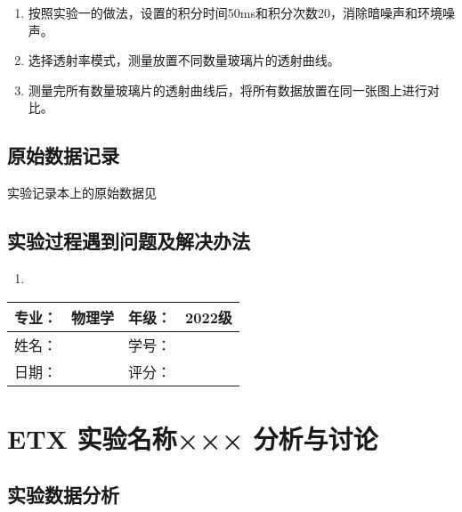 \documentclass[dvipsnames, svgnames,a4paper,11pt]{article}
\begin{document}
\begin{enumerate}
			\begin{enumerate}
				\item 按照实验一的做法，设置的积分时间50ms和积分次数20，消除暗噪声和环境噪声。
				
				\item 选择透射率模式，测量放置不同数量玻璃片的透射曲线。
				
				\item 测量完所有数量玻璃片的透射曲线后，将所有数据放置在同一张图上进行对比。
				
			\end{enumerate}
	\end{enumerate}
	
	
	\clearpage
	\subsection{原始数据记录}
	实验记录本上的原始数据见%
	

	
	\subsection{实验过程遇到问题及解决办法}
	\begin{enumerate}
		\item 
	\end{enumerate}
	
	
	
	\clearpage
	
	\begin{table}
		\renewcommand\arraystretch{1.7}
		\begin{tabularx}{\textwidth}{|X|X|X|X|}
			\hline
			专业：& 物理学 &年级：& 2022级\\
			\hline
			姓名： &  & 学号：& \\
			\hline
			日期：&  & 评分： &\\
			\hline
		\end{tabularx}
	\end{table}
	
	\section{ETX 实验名称××× \quad\heiti 分析与讨论}
	
	\subsection{实验数据分析}
	
\end{document}
